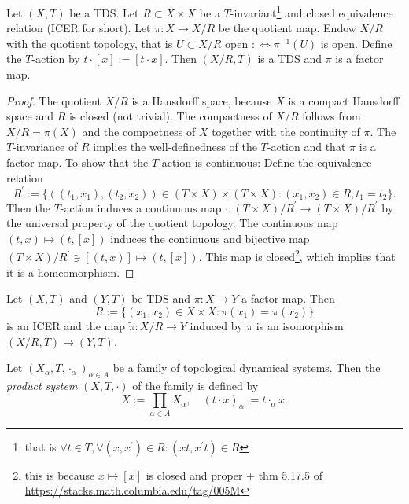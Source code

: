 \begin{proposition}
  Let $(X,T)$ be a TDS. Let $R \subset X \times X$ be a $T$-invariant\footnote{that is $\forall t \in T, \forall (x,x^\prime ) \in R : (xt ,x^\prime t) \in R$} and closed equivalence relation (ICER for short).
  Let $\pi : X \to X/R$ be the quotient map.
  Endow $X/R$ with the quotient topology, that is $U \subset X/R$ open $: \Leftrightarrow \pi^{-1}(U)$ is open.
  Define the $T$-action by $t \cdot [x] := [t \cdot x]$.
  Then $(X/R, T)$ is a TDS and $\pi$ is a factor map.
\end{proposition}
\begin{proof}
  The quotient $X/R$ is a Hausdorff space, because $X$ is a compact Hausdorff space and $R$ is closed (not trivial).
 The compactness of $X/R$ follows from $X/R = \pi (X)$ and the compactness of $X$ together with the continuity of $\pi$. The $T$-invariance of $R$ implies the well-definedness of the $T$-action and that $\pi$ is a factor map.
 To show that the $T$ action is continuous: Define the equivalence relation
 \begin{equation*}
   R^\prime := \{ ((t_1,x_1),(t_2,x_2)) \in (T \times X) \times (T \times X): (x_1, x_2) \in R, t_1 = t_2\}.
 \end{equation*}
  Then the $T$-action induces a continuous map $\cdot : (T \times X)/R^\prime \to (T\times X)/R^\prime$ by the universal property of the quotient topology.
  The continuous map $(t,x) \mapsto (t,[x])$ induces the continuous and bijective map $(T\times X)/R^\prime \ni [(t,x)] \mapsto ( t,[x])$. 
  This map is closed\footnote{this is because $x \mapsto [x]$ is closed and proper + thm 5.17.5 of \url{https://stacks.math.columbia.edu/tag/005M}}, which implies that it is a homeomorphism.
\end{proof}


\begin{proposition}
  \label{prop:icer2factor}
  Let $(X,T)$ and $(Y,T)$ be TDS and $\pi : X \to Y$ a factor map.
  Then 
  \begin{equation*}
    R:= \{ (x_1,x_2)  \in X \times X :  \pi (x_1) = \pi(x_2) \}
  \end{equation*}
  is an ICER and the map $\tilde{\pi}: X / R \to Y$ induced by $\pi$ is an isomorphism $(X/R,T) \to (Y,T)$.
\end{proposition}

\begin{definition}
  Let $(X_\alpha,T, \cdot_\alpha)_{\alpha \in A}$ be a family of topological dynamical systems.
  Then the \emph{product system} $(X, T, \cdot)$ of the family is defined by
  \begin{equation*}
    X := \prod_{\alpha \in A} X_\alpha, \quad (t \cdot x )_{\alpha} := t \cdot_\alpha x.
  \end{equation*}
\end{definition}

